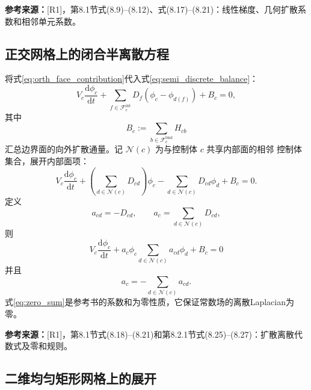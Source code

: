 \documentclass[UTF8,12pt,a4paper]{ctexart}
\numberwithin{equation}{section}
\newcommand{\Rone}{\textnormal{[R1]}}
\newcommand{\source}[1]{%
  \par\smallskip
  \noindent\colorbox{sourcebg}{%
    \parbox{0.955\linewidth}{\raggedright\footnotesize\color{sourcegray}\textbf{参考来源：}#1}%
  }
  \par\smallskip
}
\begin{document}
\source{\Rone，第8.1节式(8.9)--(8.12)、式(8.17)--(8.21)：线性梯度、几何扩散系数和相邻单元系数。}

\subsection{正交网格上的闭合半离散方程}

将式\eqref{eq:orth_face_contribution}代入式\eqref{eq:semi_discrete_balance}：
\begin{equation}
  V_c\frac{\mathrm d\phi_c}{\mathrm dt}
  +\sum_{f\in\mathcal F_c^{\mathrm{int}}}
  D_f(\phi_c-\phi_{d(f)})+B_c=0,
  \label{eq:orth_semidiscrete}
\end{equation}
其中
\begin{equation}
  B_c:=\sum_{b\in\mathcal F_c^{\mathrm{bnd}}}H_{cb}
  \label{eq:boundary_residual_definition}
\end{equation}
汇总边界面的向外扩散通量。记 $\mathcal N(c)$ 为与控制体 $c$ 共享内部面的相邻
控制体集合，展开内部面项：
\begin{equation}
  V_c\frac{\mathrm d\phi_c}{\mathrm dt}
  +\left(\sum_{d\in\mathcal N(c)}D_{cd}\right)\phi_c
  -\sum_{d\in\mathcal N(c)}D_{cd}\phi_d+B_c=0.
  \label{eq:orth_expanded}
\end{equation}
定义
\begin{equation}
  a_{cd}=-D_{cd},
  \qquad
  a_c=\sum_{d\in\mathcal N(c)}D_{cd},
  \label{eq:coeff_definition}
\end{equation}
则
\begin{equation}
  \boxed{
  V_c\frac{\mathrm d\phi_c}{\mathrm dt}
  +a_c\phi_c
  \sum_{d\in\mathcal N(c)}a_{cd}\phi_d+B_c=0}
  \label{eq:coefficient_semidiscrete}
\end{equation}
并且
\begin{equation}
  a_c=-\sum_{d\in\mathcal N(c)}a_{cd}.
  \label{eq:zero_sum}
\end{equation}
式\eqref{eq:zero_sum}是参考书的系数和为零性质，它保证常数场的离散Laplacian为零。

\source{\Rone，第8.1节式(8.18)--(8.21)和第8.2.1节式(8.25)--(8.27)：扩散离散代数式及零和规则。}

\subsection{二维均匀矩形网格上的展开}
\end{document}
